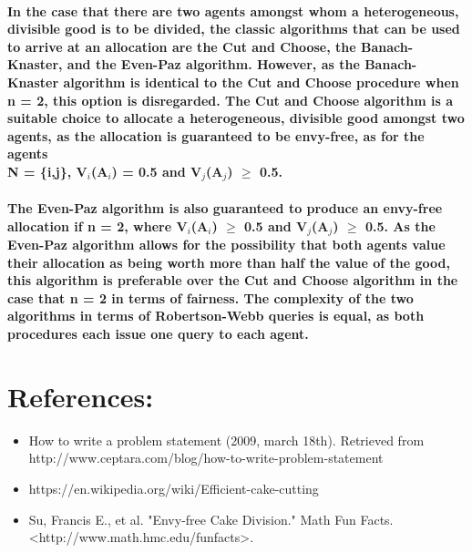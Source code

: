 \documentclass[12pt]{report}
\begin{document}
	\paragraph{In the case that there are two agents amongst whom a heterogeneous, divisible
		good is to be divided, the classic algorithms that can be used to arrive at
		an allocation are the Cut and Choose, the Banach-Knaster, and the Even-Paz
		algorithm. However, as the Banach-Knaster algorithm is identical to the Cut
		and Choose procedure when n = 2, this option is disregarded. The Cut and
		Choose algorithm is a suitable choice to allocate a heterogeneous, divisible
		good amongst two agents, as the allocation is guaranteed to be envy-free, as for
		the agents \\
		N = \{i,j\}, V$_{i}$(A$_{i}$) = 0.5 and V$_{j}$(A$_{j}$) $\geq$ 0.5.}
	\paragraph{The Even-Paz algorithm is
		also guaranteed to produce an envy-free allocation if n = 2, where V$_{i}$(A$_{i}$) $\geq$ 0.5
		and V$_{j}$(A$_{j}$) $\geq$ 0.5. As the Even-Paz algorithm allows for the possibility that both
		agents value their allocation as being worth more than half the value of the
		good, this algorithm is preferable over the Cut and Choose algorithm in the
		case that n = 2 in terms of fairness. The complexity of the two algorithms in
		terms of Robertson-Webb queries is equal, as both procedures each issue one
		query to each agent.}
	
	\section{References:}
	\begin{itemize}
		\item {How to write a problem statement (2009, march 18th). Retrieved from   http://www.ceptara.com/blog/how-to-write-problem-statement}
		
		\item {https://en.wikipedia.org/wiki/Efficient-cake-cutting}
		\item Su, Francis E., et al. "Envy-free Cake Division." Math Fun Facts. <http://www.math.hmc.edu/funfacts>.
	\end{itemize}
	
	
	
\end{document}
